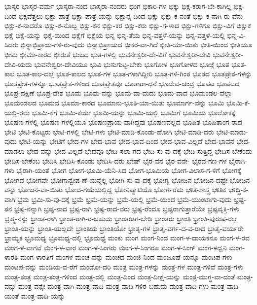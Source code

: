 {ಭಾಸ್ಕರ
ಭಾಸ್ಕರ-ವರ್ಮ
ಭಾಸ್ಕರಾ-ನಂದ
ಭಾಸ್ಕರಾ-ನಂದರು
ಭಿಂಗ
ಭಿಕಾರಿ-ಗಳ
ಭಿಕ್ಕು
ಭಿಕ್ಷ-ಕರಾಗ-ಬೇ-ಕಾಗಿಲ್ಲ
ಭಿಕ್ಷ-ದಿಂದ
ಭಿಕ್ಷವೆತ್ತಲು
ಭಿಕ್ಷಾ-ಪಾತ್ರೆ
ಭಿಕ್ಷಾ-ಪಾತ್ರೆ-ಯನ್ನು
ಭಿಕ್ಷಾನ್ನ-ದಿಂದ
ಭಿಕ್ಷು
ಭಿಕ್ಷು-ಕ-ನಂತೆ
ಭಿಕ್ಷು-ಕ-ನಾಗಿ-ರು-ವೆನು
ಭಿಕ್ಷು-ಕ-ನಾದರೊ
ಭಿಕ್ಷು-ಕ-ನೊಬ್ಬ
ಭಿಕ್ಷು-ಕನ
ಭಿಕ್ಷು-ಕರ
ಭಿಕ್ಷು-ಕರು
ಭಿಕ್ಷು-ಗ-ಳಾದ
ಭಿಕ್ಷು-ಗಳಿಗೂ
ಭಿಕ್ಷು-ವಿಗೆ
ಭಿಕ್ಷುಕ
ಭಿಕ್ಷೆ
ಭಿಕ್ಷೆ-ಯನ್ನು
ಭಿಕ್ಷೆ-ಯಿಂದ
ಭಿಕ್ಷೆಗೆ
ಭಿಕ್ಷೆಯ
ಭಿನ್ನ
ಭಿನ್ನ-ತೆಯ
ಭಿನ್ನ-ವತ್ತಳೆ-ಯನ್ನು
ಭಿನ್ನ-ವತ್ತಳೆ-ಯಲ್ಲಿ
ಭಿನ್ನ-ವಿ-ಸಿದರು
ಭಿನ್ನಾಭಿಪ್ರಾಯ-ಗಳಿ-ರು-ವುದು
ಭಿನ್ನಾಭಿಪ್ರಾಯದ
ಭೀಕರ-ವಾ-ಗಿದೆ
ಭೀತಿ-ಯಾ-ಯಿತು
ಭೀತಿ-ಯಿಂದ
ಭೀತಿಯೂ
ಭೀಮ
ಭೀಮಾ-ಕಾರದ
ಭೀರುತೆ
ಭುಜದ
ಭುತ-ಗಳಲ್ಲಿ
ಭುವನೇಶ್ವರೀ-ದೇ-ವಿಗೆ
ಭುವನೇಶ್ವರೀ-ದೇವಿ
ಭುವನೇಶ್ವರೀ-ದೇವಿ-ಯದು
ಭುವನೇಶ್ವರೀ-ದೇವಿಯೂ
ಭುವಿ
ಭುಸುಗುಟ್ಟ-ಬೇಕು
ಭೂಗೋಳ
ಭೂಗೋಳದ
ಭೂಜ್ಗೆ
ಭೂತ
ಭೂತ-ಕಾಲ
ಭೂತ-ಕಾಲ-ದಲ್ಲೆ
ಭೂತ-ಕಾಲದ
ಭೂತ-ಗಳ
ಭೂತ-ಗಳಾಗಿದ್ದೀರಿ
ಭೂತ-ಗಳಿ-ಗಿಂತ
ಭೂತದ
ಭೂತಪ್ರೇತ-ಗಳನ್ನು
ಭೂತಪ್ರೇತ-ಗಳನ್ನೂ
ಭೂತಪ್ರೇತ-ಗಳಿಂದ
ಭೂತಪ್ರೇತವೂ
ಭೂತಾರಾ-ಧನೆ
ಭೂದೇವ-ಚಂದ್ರ
ಭೂಪಟ
ಭೂಪಟದ
ಭೂಪ್ರ-ದಕ್ಷಿಣೆ
ಭೂಪ್ರ-ದೇಶ
ಭೂಮ
ಭೂಮ-ವನ್ನು
ಭೂಮ-ವಾ-ದುದು
ಭೂಮ-ವಾದ
ಭೂಮಂಡಲ-ವೆಲ್ಲಾ
ಭೂಮಂಡಲದ
ಭೂಮದ
ಭೂಮಾ-ಕಾರದ
ಭೂಮಾನು-ಭೂತಿ-ಯಾ-ಯಿತು
ಭೂಮಾರ್ಗ-ವನ್ನು
ಭೂಮಿ
ಭೂಮಿ-ಕೆ-ಯಲ್ಲಿ-ರಲು
ಭೂಮಿ-ಕೆಗೆ
ಭೂಮಿ-ಕೆಯೇ
ಭೂಮಿ-ಯನ್ನು
ಭೂಮಿ-ಯಲ್ಲಿ
ಭೂಮಿಗೆ
ಭೂಮಿಯ
ಭೂಲೋಕಕ್ಕೆ
ಭೂಷಣ-ಗಳಲ್ಲಿ
ಭೂಷಣ-ಗಳಲ್ಲಿಯೂ
ಭೂಷಣಪ್ರಾಯ-ವಾಗಿದ್ದವು
ಭೂಷಣವಲ್ಲದ
ಭೂಷಿತ
ಭೂಷಿತಾಂಗ-ರಾದ
ಭೇಟಿ
ಭೇಟಿ-ಕೊಟ್ಟರು
ಭೇಟಿ-ಗಳಲ್ಲಿ
ಭೇಟಿ-ಗಳು
ಭೇಟಿ-ಮಾಡಿ-ಕೊಂಡು-ಹೋಗಿ
ಭೇಟಿ-ಮಾಡಿ-ದರು
ಭೇಟಿ-ಮಾಡು-ವುದು
ಭೇಟಿ-ಯನ್ನು
ಭೇಟಿಗೆ
ಭೇದ-ಗಳ
ಭೇದ-ಭಾವ
ಭೇದ-ಭಾವ-ದಿಂದ
ಭೇದ-ಭಾವ-ವಿಲ್ಲದೆ
ಭೇದ-ಭಾವನೆ
ಭೇದ-ಮಾಡಲು
ಭೇದ-ವನ್ನು
ಭೇದ-ವಿಲ್ಲದೆ
ಭೇದವೂ
ಭೇದಿ-ಸಲಾ-ಗದ
ಭೇದಿ-ಸು-ವು-ದಕ್ಕೆ
ಭೇದಿ-ಸುತ್ತಿದ್ದ
ಭೇದಿಸ-ಬೇಕೆಂದು
ಭೇದಿಸ-ಬೇಕೆಂಬ
ಭೇದಿಸಿ
ಭೇದಿಸಿ-ಕೊಂಡು
ಭೇದಿಸಿ-ದರು
ಭೇಷ್
ಭೈರ-ವನ
ಭೈರ-ವನೇ-
ಭೈರವ-ಗಣ-ಗಳ
ಭೈರಾಗಿ-ಗಳು
ಭೈರಾಗಿ-ಯಂತೆ
ಭೋಗ
ಭೋಗ-ಭೂಮಿ-ಯೆನಿ-ಸಿದ
ಭೋಗ-ಭೂಮಿಯ
ಭೋಗ-ವಿಲಾಸ-ಗ-ಳಿಗೆ
ಭೋಗಕ್ಕೆ
ಭೋಗದ
ಭೋಗವೇ
ಭೋಗಾನ್ವೇಷ-ಣೆ-ಯನ್ನೆಲ್ಲ
ಭೋಗಿ-ಸು-ವು-ದಕ್ಕೆ
ಭೋಗ್ಯ
ಭೋಜನ
ಭೋಜನ-ದಷ್ಟೇ
ಭೋಜನ-ವನ್ನು
ಭೋಜನ-ವಾ-ಯಿತು
ಭೋದ-ಗಯೆಯಲ್ಲಿದ್ದ
ಭೋನಿಪ್ಯಾಟಿಯೊ
ಭೋರ್ಗರೆದು
ಭೌತ-ಶಾಸ್ತ್ರ
ಭೌತಿಕ
ಭೌದ್ಧಿ-ಕ-ವಾಗಿ
ಭ್ರಮ
ಭ್ರಮಿ-ಸು-ವು-ದಕ್ಕೆ
ಭ್ರಮೆ
ಭ್ರಮೆ-ಯನ್ನು
ಭ್ರಮೆ-ಯಲ್ಲಿ
ಭ್ರಮೆ-ಯಿಂದ
ಭ್ರಮೆ-ಯುಂಟಾಗು-ವುದು
ಭ್ರಷ್ಟ-ತನ
ಭ್ರಷ್ಟ-ನನ್ನಾಗಿ
ಭ್ರಷ್ಟ-ನಾದ
ಭ್ರಷ್ಟ-ರಾಗಿ
ಭ್ರಷ್ಟ-ರಾದ-ವರು
ಭ್ರಷ್ಟ-ರೆಂದೂ
ಭ್ರಷ್ಟರಾಗುತ್ತಾರೆಯೇ
ಭ್ರಷ್ಟವೃಕ್ತಿ-ಗಳು
ಭ್ರಹ್ಮ-ನನ್ನು
ಭ್ರಾಂತ-ರಾಗಿ
ಭ್ರಾಂತ-ರಾಗಿ-ರ-ಬಹುದು
ಭ್ರಾಂತರಾಗ-ಬೇಡಿ
ಭ್ರಾಂತರು
ಭ್ರಾಂತಿ
ಭ್ರಾಂತಿ-ಪುರುಷ-ರಲ್ಲ
ಭ್ರಾಂತಿ-ಯನ್ನು
ಭ್ರಾಂತಿ-ಯಲ್ಲದೇ
ಭ್ರಾಂತಿಯ
ಭ್ರಾಂತಿಯೋ
ಭ್ರಾತೃ-ಗಳ
ಭ್ರಾತೃ-ವರ್ಗ-ದ-ವ-ರಾದ
ಭ್ರಾತೃ-ವರ್ಯರೇ
ಭ್ರಾಮ್ಯಕ
ಭ್ರೂಮಧ್ಯ
ಭ್ರೂಮಧ್ಯ-ದಲ್ಲಿ
ಭ್ರೂಮಧ್ಯೆ
ಮಂಕು
ಮಂಗ
ಮಂಗ-ನಿಂದ
ಮಂಗ-ಳ-ದಾಯಕನೂ
ಮಂಗ-ಳ-ರವ
ಮಂಗ-ಳ-ವಾಗವೆ
ಮಂಗ-ಳ-ವಾರ
ಮಂಗ-ಳ-ಸಿಂಗರು
ಮಂಗ-ಳ-ಸಿಂಗರೂ
ಮಂಗ-ಳ-ಸಿಂಗ್
ಮಂಗ-ಳಧ್ವನಿ
ಮಂಗ-ಳಾರತಿ
ಮಂಗ-ಳಾರತಿಗೆ
ಮಂಗಳ
ಮಂಚ-ವನ್ನು
ಮಂಚದ
ಮಂಜಿ-ನಿಂದ
ಮಂಜೂಷೆ-ಯನ್ನೂ
ಮಂಟಪ-ಗಳು
ಮಂಟಪ-ವನ್ನು
ಮಂಡಿಯ-ವ-ರೆಗೆ
ಮಂಡೋ-ದರಿ
ಮಂತ್ರ
ಮಂತ್ರ-ಗಳನ್ನು
ಮಂತ್ರ-ಗಳ
ಮಂತ್ರ-ಗಳಿವೆ
ಮಂತ್ರ-ಗಳು
ಮಂತ್ರ-ತಂತ್ರ
ಮಂತ್ರ-ತಂತ್ರ-ಗಳಿಂದ
ಮಂತ್ರ-ದಲ್ಲಿ
ಮಂತ್ರ-ದಿಂದ
ಮಂತ್ರ-ದೀಕ್ಷೆ-ಯನ್ನು
ಮಂತ್ರ-ಮುಗ್ಧ-ವಾ-ದಂತೆ
ಮಂತ್ರ-ವನ್ನು
ಮಂತ್ರ-ವನ್ನೇ
ಮಂತ್ರ-ವಾಗಿ
ಮಂತ್ರ-ವಾದಿ
ಮಂತ್ರ-ವಾದಿ-ಗಳಿರ-ಬಹುದು
ಮಂತ್ರ-ವಾದಿ-ಗಳು
ಮಂತ್ರ-ವಾದಿ-ಯಂತೆ
ಮಂತ್ರ-ವಾದಿ-ಯನ್ನು
}
